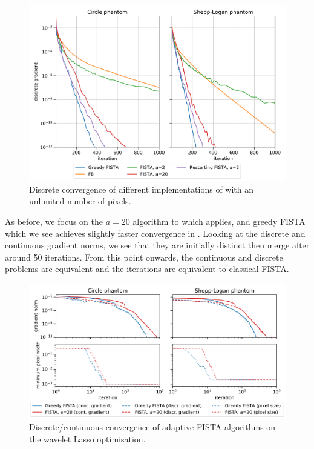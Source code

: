 \documentclass[10pt,a4paper,onecolumn]{article} \usepackage[latin1]{inputenc}
\numberwithin{equation}{section}
\begin{document}
\begin{figure}[H]\centering
	\includegraphics[width=.84\textwidth]{haar_convergence}
	\caption{Discrete convergence of different implementations of  with an unlimited number of pixels.}\label{fig:ca: haar convergence}
\end{figure}

As before, we focus on the $a=20$ algorithm to which  applies, and greedy FISTA which we see achieves slightly faster convergence in . Looking at the discrete and continuous gradient norms, we see that they are initially distinct then merge after around 50 iterations. From this point onwards, the continuous and discrete problems are equivalent and the iterations are equivalent to classical FISTA.

\begin{figure}\centering
	\includegraphics[width=.84\textwidth]{haar_reduced_convergence}
	\caption{Discrete/continuous convergence of adaptive FISTA algorithms on the wavelet Lasso optimisation.}\label{fig:ca: haar convergence zoom}
\end{figure}
\end{document}

